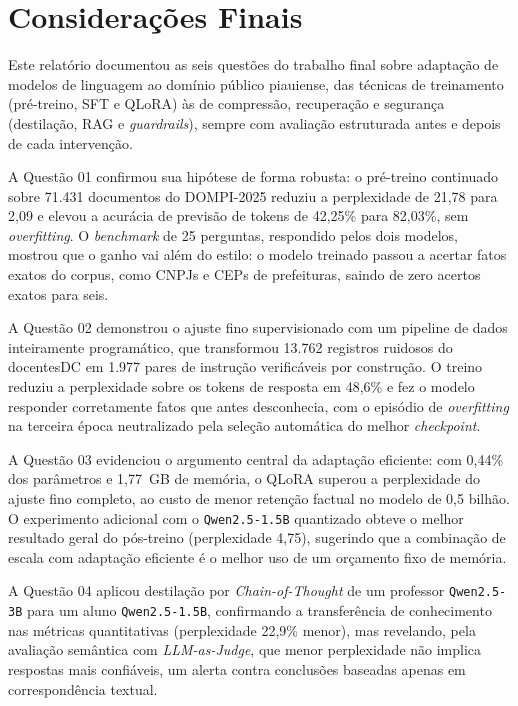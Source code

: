 \section{Considerações Finais}
\label{sec:consideracoes}

Este relatório documentou as seis questões do trabalho final sobre adaptação de
modelos de linguagem ao domínio público piauiense, das técnicas de treinamento
(pré-treino, SFT e QLoRA) às de compressão, recuperação e segurança (destilação, RAG
e \textit{guardrails}), sempre com avaliação estruturada antes e depois de cada
intervenção.

A Questão 01 confirmou sua hipótese de forma robusta: o pré-treino continuado sobre
71.431 documentos do DOMPI-2025 reduziu a perplexidade de 21,78 para 2,09 e elevou a
acurácia de previsão de tokens de 42,25\% para 82,03\%, sem \textit{overfitting}. O
\textit{benchmark} de 25 perguntas, respondido pelos dois modelos, mostrou que o
ganho vai além do estilo: o modelo treinado passou a acertar fatos exatos do corpus,
como CNPJs e CEPs de prefeituras, saindo de zero acertos exatos para seis.

A Questão 02 demonstrou o ajuste fino supervisionado com um pipeline de dados
inteiramente programático, que transformou 13.762 registros ruidosos do docentesDC
em 1.977 pares de instrução verificáveis por construção. O treino reduziu a
perplexidade sobre os tokens de resposta em 48,6\% e fez o modelo responder
corretamente fatos que antes desconhecia, com o episódio de \textit{overfitting} na
terceira época neutralizado pela seleção automática do melhor \textit{checkpoint}.

A Questão 03 evidenciou o argumento central da adaptação eficiente: com 0,44\% dos
parâmetros e 1,77~GB de memória, o QLoRA superou a perplexidade do ajuste fino
completo, ao custo de menor retenção factual no modelo de 0,5 bilhão. O experimento
adicional com o \texttt{Qwen2.5-1.5B} quantizado obteve o melhor resultado geral do
pós-treino (perplexidade 4,75), sugerindo que a combinação de escala com adaptação
eficiente é o melhor uso de um orçamento fixo de memória.

A Questão 04 aplicou destilação por \textit{Chain-of-Thought} de um professor
\texttt{Qwen2.5-3B} para um aluno \texttt{Qwen2.5-1.5B}, confirmando a transferência
de conhecimento nas métricas quantitativas (perplexidade 22,9\% menor), mas revelando,
pela avaliação semântica com \textit{LLM-as-Judge}, que menor perplexidade não implica
respostas mais confiáveis, um alerta contra conclusões baseadas apenas em
correspondência textual.

